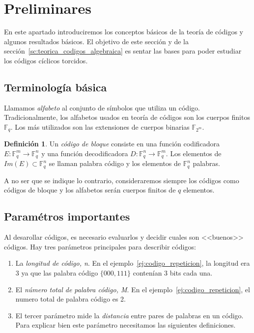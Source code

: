\documentclass[a4paper,11pt]{article}
\numberwithin{equation}{section}
\theoremstyle{definition} %
\newtheorem{definicion}{Definición}[section]
\newcommand{\Fq}{\mathbb{F}_q}
\newcommand{\Fqn}{\mathbb{F}_q^n}
\newcommand{\Fbm}{\mathbb{F}_{2^m}}
\begin{document}
    \section{Preliminares}

    En este apartado introduciremos los conceptos básicos de la teoría de códigos y algunos resultados básicos. El objetivo de este sección y de la sección~\ref{sc:teorica_codigos_algebraica} es sentar las bases para poder estudiar los códigos cíclicos torcidos.

    \subsection{Terminología básica}

    Llamamos \emph{alfabeto} al conjunto de símbolos que utiliza un código. Tradicionalmente, los alfabetos usados en teoría de códigos son los cuerpos finitos $\Fq$. Los más utilizados son las extensiones de cuerpos binarias $\Fbm$.

    \begin{definicion}
        Un \emph{código de bloque} consiste en una función codificadora $E: \mathbb{F}_q^m \to \mathbb{F}_q^n$ y una función decodificadora $D: \mathbb{F}_q^n \to \mathbb{F}_q^m $. Los elementos de $Im(E) \subset \Fqn$ se llaman palabra código y los elementos de $\Fqn$ palabras.
    \end{definicion}

    A no ser que se indique lo contrario, consideraremos siempre los códigos como códigos de bloque y los alfabetos serán cuerpos finitos de $q$ elementos.

    \subsection{Paramétros importantes}

    Al desarollar códigos, es necesario evaluarlos y decidir cuales son <<buenos>> códigos. Hay tres parámetros principales para describir códigos:
    \begin{enumerate}
        \item La \emph{longitud de código, n}. En el ejemplo~\ref{ej:codigo_repeticion}, la longitud era 3 ya que las palabra código $\{000, 111\}$ contenían 3 bits cada una.
        \item El \emph{número total de palabra código, M}. En el ejemplo~\ref{ej:codigo_repeticion}, el numero total de palabra código es 2.
        \item El tercer parámetro mide la \emph{distancia} entre pares de palabras en un código. Para explicar bien este parámetro necesitamos las siguientes definiciones.
    \end{enumerate}
\end{document}

